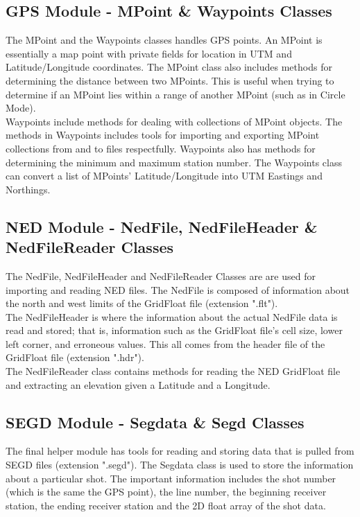 \documentclass[12pt]{article}
\begin{document}
\subsection{GPS Module - MPoint \& Waypoints Classes}

The MPoint and the Waypoints classes handles GPS points. An MPoint is essentially a map point with private fields for location in UTM and Latitude/Longitude coordinates. The MPoint class also includes methods for determining the distance between two MPoints. This is useful when trying to determine if an MPoint lies within a range of another MPoint (such as in Circle Mode). \\

Waypoints include methods for dealing with collections of MPoint objects. The methods in Waypoints includes tools for importing and exporting MPoint collections from and to files respectfully. Waypoints also has methods for determining the minimum and maximum station number. The Waypoints class can convert a list of MPoints' Latitude/Longitude into UTM Eastings and Northings. 

\subsection{NED Module - NedFile, NedFileHeader \& NedFileReader Classes}

The NedFile, NedFileHeader and NedFileReader Classes are are used for importing and reading NED files. The NedFile is composed of information about the north and west limits of the GridFloat file (extension ".flt"). \\

The NedFileHeader is where the information about the actual NedFile data is read and stored; that is, information such as the GridFloat file's cell size, lower left corner, and erroneous values. This all comes from the header file of the GridFloat file (extension ".hdr"). \\

The NedFileReader class contains methods for reading the NED GridFloat file and extracting an elevation given a Latitude and a Longitude. 

\subsection{SEGD Module - Segdata \& Segd Classes}

The final helper module has tools for reading and storing data that is pulled from SEGD files (extension ".segd"). The Segdata class is used to store the information about a particular shot. The important information includes the shot number (which is the same the GPS point), the line number, the beginning receiver station, the ending receiver station and the 2D float array of the shot data. \\ 
\end{document}
